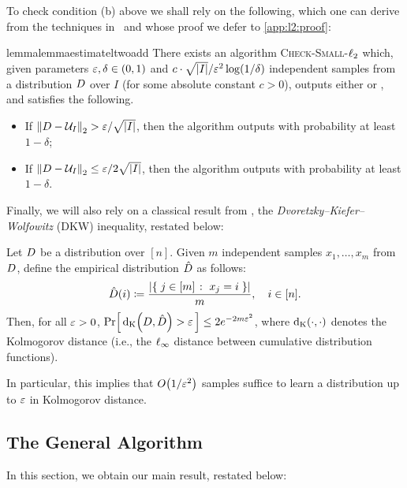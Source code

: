 \noindent To check condition \textsf{(b)} above we shall rely on the following, which one can derive from the techniques in~\cite{DKN:15} and whose proof we defer to \cref{app:l2:proof}:
\
\begin{restatable}[Adapted from {\cite[Theorem 11]{DKN:15}}]{lemma}{lemmaestimateltwoadd}\label{lemma:estimate:l2:add}
There exists an algorithm \textsc{Check-Small-$\lp[2]$} which, given parameters $\eps,\delta\in(0,1)$ and $c\cdot{\sqrt{\abs{I}}}/{\eps^2} \log(1/\delta)$ independent samples from a distribution $\D$ over $I$ (for some absolute constant $c>0$), outputs either \yes or \no, and satisfies the following.
  \begin{itemize}
    \item If $\normtwo{\D-\uniform_I} > {\eps}/{\sqrt{\abs{I}}}$, then the algorithm outputs \no with probability at least $1-\delta$;
    \item If $\normtwo{\D-\uniform_I} \leq {\eps}/{2\sqrt{\abs{I}}}$, then the algorithm outputs \yes with probability at least $1-\delta$.
  \end{itemize}
\end{restatable}

Finally, we will also rely on a classical result from , the \emph{Dvoretzky--Kiefer--Wolfowitz} (DKW) inequality, restated below:
\begin{theorem}[\cite{DKW:56,Massart:90}]\label{theo:dkw:ineq}
Let $\D$ be a distribution over $[n]$. Given $m$ independent samples $x_1,\dots ,x_m$ from $\D$, define the empirical distribution $\hat{\D}$ as follows:
\[
\hat{\D}(i) \eqdef \frac{\abs{ \setOfSuchThat{j\in[m]}{x_j=i} } }{m}, \quad i\in[n].
\]
Then, for all $\eps > 0$, $\probaOf{ \kolmogorov{\D}{\hat{\D}} > \eps } \leq 2e^{-2m\eps^2}$, where $\kolmogorov{\cdot}{\cdot}$ denotes the Kolmogorov distance (i.e., the $\lp[\infty]$ distance between cumulative distribution functions).
\end{theorem} 
\noindent In particular, this implies that $\bigO{1/\eps^2}$ samples suffice to learn a distribution up to $\eps$ in Kolmogorov distance.
 
\subsection{The General Algorithm}\label{sec:algorithm}
In this section, we obtain our main result, restated below:
\mainthmtestingalgo*

